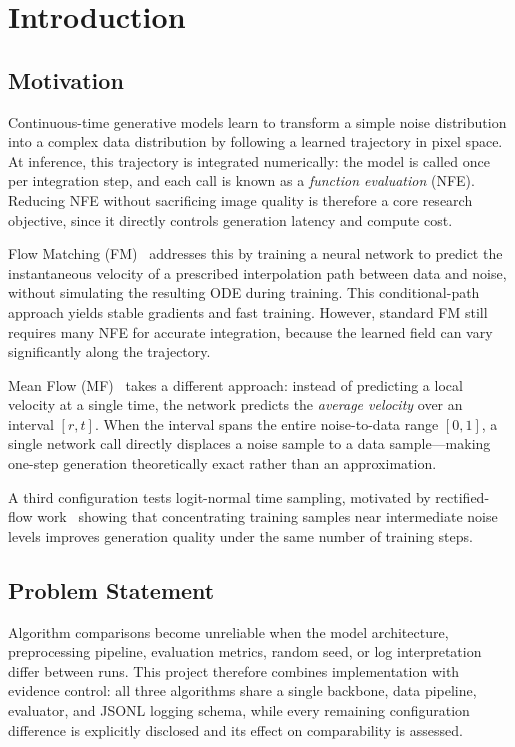 ﻿\chapter{Introduction}

\section{Motivation}

Continuous-time generative models learn to transform a simple noise distribution
into a complex data distribution by following a learned trajectory in pixel space.
At inference, this trajectory is integrated numerically: the model is called once
per integration step, and each call is known as a \emph{function evaluation}
(NFE). Reducing NFE without sacrificing image quality is therefore a core research
objective, since it directly controls generation latency and compute cost.

Flow Matching (FM)~\cite{lipman2023flow} addresses this by training a neural
network to predict the instantaneous velocity of a prescribed interpolation path
between data and noise, without simulating the resulting ODE during training. This
conditional-path approach yields stable gradients and fast training. However,
standard FM still requires many NFE for accurate integration, because the learned
field can vary significantly along the trajectory.

Mean Flow (MF)~\cite{geng2025mean} takes a different approach: instead of
predicting a local velocity at a single time, the network predicts the
\emph{average velocity} over an interval $[r, t]$. When the interval spans the
entire noise-to-data range $[0, 1]$, a single network call directly displaces a
noise sample to a data sample---making one-step generation theoretically exact
rather than an approximation.

A third configuration tests logit-normal time sampling, motivated by
rectified-flow work~\cite{esser2024scaling} showing that concentrating training
samples near intermediate noise levels improves generation quality under the
same number of training steps.

\section{Problem Statement}

Algorithm comparisons become unreliable when the model architecture,
preprocessing pipeline, evaluation metrics, random seed, or log interpretation
differ between runs. This project therefore combines implementation with evidence
control: all three algorithms share a single backbone, data pipeline, evaluator,
and JSONL logging schema, while every remaining configuration difference is
explicitly disclosed and its effect on comparability is assessed.

